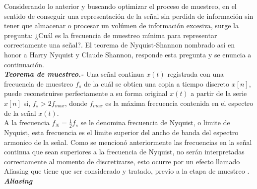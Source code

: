 Considerando lo anterior y buscando optimizar el proceso de muestreo, en el sentido de conseguir una representaci\'on de la señal sin perdida de informaci\'on sin tener que almacenar o procesar un vol\'umen de informaci\'on excesiva, surge la pregunta: ¿Cu\'al es la frecuencia de muestreo m\'inima para representar correctamente una señal?. El teorema de Nyquist-Shannon nombrado as\'i en honor a Harry Nyquist y Claude Shannon, responde esta pregunta y se enuncia a continuaci\'on.\\

\noindent
\textbf{\textit{Teorema de muestreo.- }}Una señal continua \begin{math}x(t)\end{math} registrada con una frecuencia de muestreo \begin{math}f_s\end{math} de la cu\'al se obtien una copia a tiempo discreto \begin{math}x[n]\end{math}, puede reconstruirse perfectamente a su forma original \begin{math}x(t)\end{math} a partir de la serie \begin{math}x[n]\end{math} si,  \begin{math}f_s > 2f_{max}\end{math}, donde \begin{math}f_{max}\end{math} es la m\'axima frecuencia contenida en el espectro de la señal \begin{math}x(t)\end{math}.\\

A la frecuencia \begin{math}f_N = \frac{1}{2}f_s\end{math} se le denomina frecuencia de Nyquist, o limite de Nyquist, esta frecuencia es el limite superior del ancho de banda del espectro armonico de la señal. Como se mencion\'o anteriormente las frecuencias en la señal continua que sean superiores a la frecuencia de Nyquist, no ser\'an interpretadas correctamente al momento de discretizarse, esto ocurre por un efecto llamado Aliasing que tiene que ser considerado y tratado, previo a la etapa de muestreo \cite{smith}.\\

\noindent
\textbf{\textit{Aliasing}}\\
\indent


